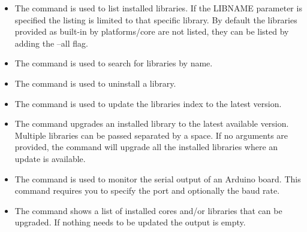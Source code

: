 \begin{itemize}
	\item {}
	
	The command  is used to list installed libraries.
	If the LIBNAME parameter is specified the listing is limited to that specific library. By default the libraries provided as built-in by platforms/core are not listed, they can be listed by adding the --all flag.
	
	
	\item {}
	
	The command  is used to search for libraries by name.
	
	
	\item {}
	
	The command  is used to uninstall a library.
	
	
	\item {}
	
	The command  is used to update the libraries index to the latest version.
	
	
	\item {}
	
	The command  upgrades an installed library to the latest available version. Multiple libraries can be passed separated by a space. If no arguments are provided, the command will upgrade all the installed libraries where an update is available.
	
	
	\item {}
	
	The command  is used to monitor the serial output of an Arduino board. This command requires you to specify the port and optionally the baud rate.
	
	
	\item {}
	
	The command  shows a list of installed cores and/or libraries that can be upgraded. If nothing needs to be updated the output is empty.
	

\end{itemize}
